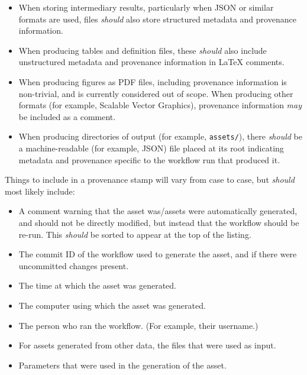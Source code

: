 \documentclass{article}
\newcommand\rfcword[1]{\emph{#1}\xspace}
\newcommand\should{\rfcword{should}}
\newcommand\may{\rfcword{may}}
\newcommand\filename[1]{\texttt{#1}\xspace}
\begin{document}
\begin{itemize}
  \item
        When storing intermediary results,
        particularly when JSON or similar formats are used,
        files \should also store structured metadata and provenance information.
  \item
        When producing tables and definition files,
        these \should also include
        unstructured metadata and provenance information
        in LaTeX comments.
  \item
        When producing figures as PDF files,
        including provenance information is non-trivial,
        and is currently considered out of scope.
        When producing other formats
        (for example, Scalable Vector Graphics),
        provenance information \may be included as a comment.
  \item
        When producing directories of output
        (for example, \filename{assets/}),
        there \should be a machine-readable
        (for example, JSON)
        file placed at its root
        indicating metadata and provenance specific to the workflow run that produced it.
\end{itemize}

Things to include in a provenance stamp will vary from case to case,
but \should most likely include:

\begin{itemize}
  \item
        A comment warning that the asset was/assets were automatically generated,
        and should not be directly modified,
        but instead that the workflow should be re-run.
        This \should be sorted to appear at the top of the listing.
  \item
        The commit ID of the workflow used to generate the asset,
        and if there were uncommitted changes present.
  \item
        The time at which the asset was generated.
  \item
        The computer using which the asset was generated.
  \item
        The person who ran the workflow.
        (For example, their username.)
  \item
        For assets generated from other data,
        the files that were used as input.
  \item
        Parameters that were used in the generation of the asset.
\end{itemize}
\end{document}

